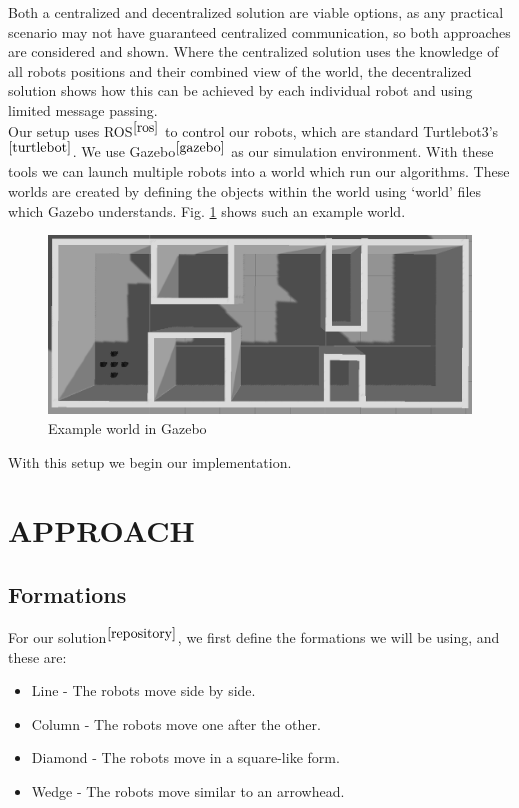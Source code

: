 \documentclass[letterpaper, 10 pt, conference]{ieeeconf}  %
\begin{document}
Both a centralized and decentralized solution are viable options, as any practical scenario may not have guaranteed centralized communication, so both approaches are considered and shown. Where the centralized solution uses the knowledge of all robots positions and their combined view of the world, the decentralized solution shows how this can be achieved by each individual robot and using limited message passing. \\

Our setup uses ROS$^{\cite{ros}}$ to control our robots, which are standard Turtlebot3's$^{\cite{turtlebot}}$. We use Gazebo$^{\cite{gazebo}}$ as our simulation environment. With these tools we can launch multiple robots into a world which run our algorithms. These worlds are created by defining the objects within the world using `world' files which Gazebo understands. Fig. \ref{corridorworld} shows such an example world.

\begin{figure}[thpb]
\centering
\includegraphics[width=\linewidth]{corridorworld}
\caption{Example world in Gazebo}
\label{corridorworld}
\end{figure}

With this setup we begin our implementation.

\section{APPROACH}

\subsection{Formations}

For our solution$^{\cite{repository}}$, we first define the formations we will be using, and these are:

\begin{itemize}
\item Line - The robots move side by side.
\item Column - The robots move one after the other.
\item Diamond - The robots move in a square-like form.
\item Wedge - The robots move similar to an arrowhead.
\end{itemize}
\end{document}

